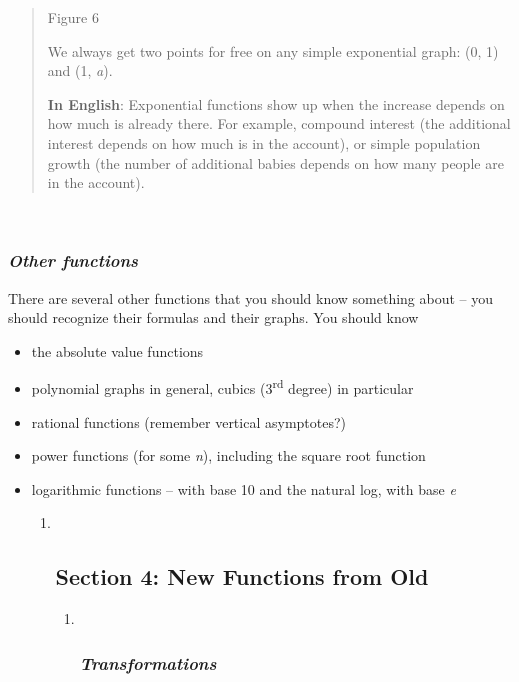 \begin{quote}
Figure 6

We always get two points for free on any simple exponential graph: (0,
1) and (1, \emph{a}).

\textbf{In English}: Exponential functions show up when the increase
depends on how much is already there. For example, compound interest
(the additional interest depends on how much is in the account), or
simple population growth (the number of additional babies depends on how
many people are in the account).
\end{quote}

\emph{\textbf{\\
}}

\subsubsection{\texorpdfstring{\emph{\textbf{Other
functions}}}{Other functions}}\label{other-functions}

There are several other functions that you should know something about
-- you should recognize their formulas and their graphs. You should know

\begin{itemize}
\item
  the absolute value functions
\item
  polynomial graphs in general, cubics (3\textsuperscript{rd} degree) in
  particular
\item
  rational functions (remember vertical asymptotes?)
\item
  power functions (for some \emph{n}), including the square root
  function
\item
  logarithmic functions -- with base 10 and the natural log, with base
  \emph{e}

  \begin{enumerate}
  \item ~
    \subsection{}\label{section-1}

    \hypertarget{section-4-new-functions-from-old}{\subsection{Section
    4: New Functions from Old}\label{section-4-new-functions-from-old}}

    \begin{enumerate}
    \item ~
      \subsubsection{\texorpdfstring{\emph{\textbf{Transformations}}}{Transformations}}\label{transformations}
    \end{enumerate}
  \end{enumerate}
\end{itemize}

